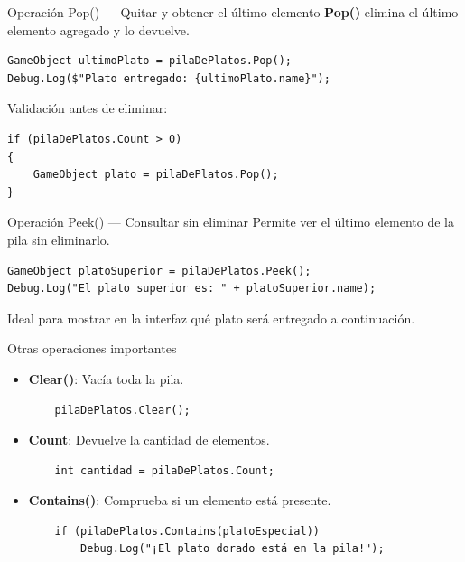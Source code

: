 \documentclass{beamer}
\begin{document}
\begin{frame}[fragile]{Operación Pop() — Quitar y obtener el último elemento}
\textbf{Pop()} elimina el último elemento agregado y lo devuelve.
\begin{lstlisting}
GameObject ultimoPlato = pilaDePlatos.Pop();
Debug.Log($"Plato entregado: {ultimoPlato.name}");
\end{lstlisting}

Validación antes de eliminar:
\begin{lstlisting}
if (pilaDePlatos.Count > 0)
{
    GameObject plato = pilaDePlatos.Pop();
}
\end{lstlisting}
\end{frame}

\begin{frame}[fragile]{Operación Peek() — Consultar sin eliminar}
Permite ver el último elemento de la pila sin eliminarlo.
\begin{lstlisting}
GameObject platoSuperior = pilaDePlatos.Peek();
Debug.Log("El plato superior es: " + platoSuperior.name);
\end{lstlisting}

Ideal para mostrar en la interfaz qué plato será entregado a continuación.
\end{frame}

\begin{frame}[fragile]{Otras operaciones importantes}
\begin{itemize}
    \item \textbf{Clear()}: Vacía toda la pila.
    \begin{lstlisting}
    pilaDePlatos.Clear();
    \end{lstlisting}

    \item \textbf{Count}: Devuelve la cantidad de elementos.
    \begin{lstlisting}
    int cantidad = pilaDePlatos.Count;
    \end{lstlisting}

    \item \textbf{Contains()}: Comprueba si un elemento está presente.
    \begin{lstlisting}
    if (pilaDePlatos.Contains(platoEspecial))
        Debug.Log("¡El plato dorado está en la pila!");
    \end{lstlisting}
\end{itemize}
\end{frame}
\end{document}

